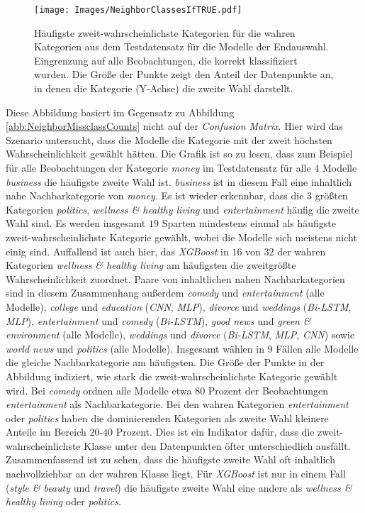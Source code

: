 \documentclass[a4paper,11pt]{article}
\begin{document}
\begin{figure}[ht]
    \centering
\texttt{[image: Images/NeighborClassesIfTRUE.pdf]} 
\caption{Häufigste zweit-wahrscheinlichste Kategorien für die wahren Kategorien aus dem Testdatensatz für die Modelle der Endauswahl. Eingrenzung auf alle Beobachtungen, die korrekt klassifiziert wurden. Die Größe der Punkte zeigt den Anteil der Datenpunkte an, in denen die Kategorie (Y-Achse) die zweite Wahl darstellt.}
\label{abb:NeighborClassesIfTRUE}
\end{figure}

Diese Abbildung basiert im Gegensatz zu Abbildung  \ref{abb:NeighborMissclassCounts} nicht auf der \textit{Confusion Matrix}. Hier wird das Szenario untersucht, dass die Modelle die Kategorie mit der zweit höchsten Wahrscheinlichkeit gewählt hätten. Die Grafik ist so zu lesen, dass zum Beispiel für alle Beobachtungen der Kategorie \textit{money} im Testdatensatz für alle $4$ Modelle \textit{business} die häufigste zweite Wahl ist. \textit{business} ist in diesem Fall eine inhaltlich nahe Nachbarkategorie von \textit{money}.
Es ist wieder erkennbar, dass die $3$ größten Kategorien \textit{politics}, \textit{wellness \& healthy living} und \textit{entertainment} häufig die zweite Wahl sind. Es werden insgesamt $19$ Sparten mindestens einmal als häufigste zweit-wahrscheinlichste Kategorie gewählt, wobei die Modelle sich meistens nicht einig sind. Auffallend ist auch hier, das \textit{XGBoost} in $16$ von $32$ der wahren Kategorien \textit{wellness \& healthy living} am häufigsten die zweitgrößte Wahrscheinlichkeit zuordnet. Paare von inhaltlichen nahen Nachbarkategorien sind in diesem Zusammenhang außerdem \textit{comedy} und \textit{entertainment} (alle Modelle),
\textit{college} und \textit{education} (\textit{CNN}, \textit{MLP}), \textit{divorce} und \textit{weddings} (\textit{Bi-LSTM}, \textit{MLP}), \textit{entertainment} und \textit{comedy} (\textit{Bi-LSTM}), \textit{good news} und \textit{green \& environment} (alle Modelle), \textit{weddings} und \textit{divorce} (\textit{Bi-LSTM}, \textit{MLP}, \textit{CNN}) sowie \textit{world news} und \textit{politics} (alle Modelle). Insgesamt wählen in $9$ Fällen alle Modelle die gleiche Nachbarkategorie am häufigsten. Die Größe der Punkte in der Abbildung indiziert, wie stark die zweit-wahrscheinlichste Kategorie gewählt wird. Bei \textit{comedy} ordnen alle Modelle etwa $80$ Prozent der Beobachtungen \textit{entertainment} als Nachbarkategorie. Bei den wahren Kategorien \textit{entertainment} oder \textit{politics} haben die dominierenden Kategorien als zweite Wahl kleinere Anteile im Bereich $20$-$40$ Prozent. Dies ist ein Indikator dafür, dass die zweit-wahrscheinlichste Klasse unter den Datenpunkten öfter unterschiedlich ausfällt. Zusammenfassend ist zu sehen, dass die häufigste zweite Wahl oft inhaltlich nachvollziehbar an der wahren Klasse liegt. Für \textit{XGBoost} ist nur in einem Fall (\textit{style \& beauty} und \textit{travel}) die häufigste zweite Wahl eine andere als \textit{wellness \& healthy living} oder \textit{politics}.\\
\\
\end{document}
